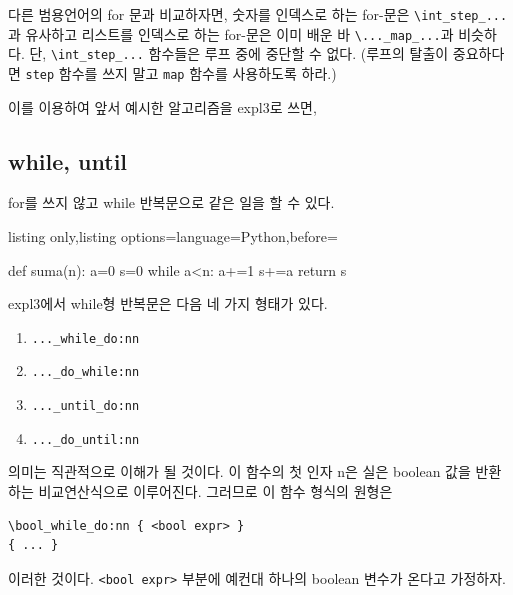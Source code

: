 \documentclass[a4paper,amsmath]{oblivoir}
\newcounter{sub}
\begin{document}
다른 범용언어의 for 문과 비교하자면, 숫자를 인덱스로 하는 for-문은 \verb|\int_step_...|과 유사하고 리스트를 인덱스로 하는 for-문은 이미 배운 바 \verb|\..._map_...|과 비슷하다.
단, \verb|\int_step_...| 함수들은 루프 중에 중단할 수 없다. (루프의 탈출이 중요하다면 \verb|step| 함수를 쓰지 말고 \verb|map| 함수를 사용하도록 하라.)

이를 이용하여 앞서 예시한 알고리즘을 expl3로 쓰면,



\subsection{while, until}

for를 쓰지 않고 while 반복문으로 같은 일을 할 수 있다.
\begin{tcblisting}{listing only,listing options={language=Python},before={\par\medskip{}}}
def suma(n):
    a=0
    s=0
    while a<n:
        a+=1
        s+=a
    return s
\end{tcblisting}

expl3에서 while형 반복문은 다음 네 가지 형태가 있다.
\begin{enumerate}[(1)] \firmlist
\item \verb|..._while_do:nn|
\item \verb|..._do_while:nn|
\item \verb|..._until_do:nn|
\item \verb|..._do_until:nn|
\end{enumerate}

의미는 직관적으로 이해가 될 것이다. 이 함수의 첫 인자 n은 실은 boolean 값을 반환하는 비교연산식으로 이루어진다. 그러므로 이 함수 형식의 원형은
\begin{verbatim}
\bool_while_do:nn { <bool expr> }
{ ... }
\end{verbatim}
이러한 것이다. \texttt{<bool expr>} 부분에 예컨대 하나의 boolean 변수가 온다고 가정하자.
\end{document}
